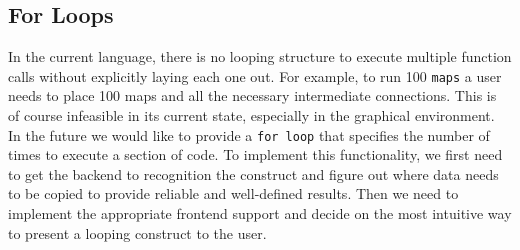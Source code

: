 \documentclass[twocolumn]{article}
\renewcommand{\|}{\origbar} %
\newcommand{\code}[1]{\texttt{#1}}
\begin{document}
\subsection{For Loops}

In the current language, there is no looping structure to execute multiple function calls without explicitly laying each one out. For example, to run 100 \code{maps} a user needs to place 100 maps and all the necessary intermediate connections. This is of course infeasible in its current state, especially in the graphical environment. In the future we would like to provide a \code{for loop} that specifies the number of times to execute a section of code. To implement this functionality, we first need to get the backend to recognition the construct and figure out where data needs to be copied to provide reliable and well-defined results. Then we need to implement the appropriate frontend support and decide on the most intuitive way to present a looping construct to the user.



\end{document}

